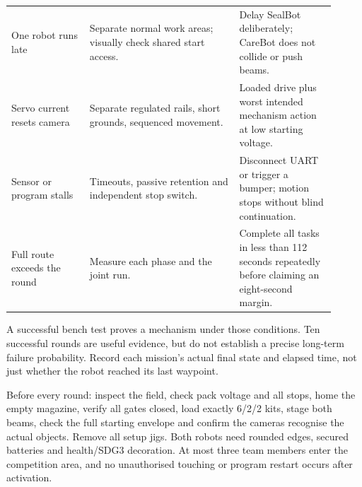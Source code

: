 \documentclass[10pt,a4paper]{article}
\begin{document}
\begin{longtable}{@{}>{\raggedright\arraybackslash}p{0.22\linewidth}>{\raggedright\arraybackslash}p{0.42\linewidth}>{\raggedright\arraybackslash}p{0.27\linewidth}@{}}
One robot runs late & Separate normal work areas; visually check shared start access. & Delay SealBot deliberately; CareBot does not collide or push beams. \\[3pt]
Servo current resets camera & Separate regulated rails, short grounds, sequenced movement. & Loaded drive plus worst intended mechanism action at low starting voltage. \\[3pt]
Sensor or program stalls & Timeouts, passive retention and independent stop switch. & Disconnect UART or trigger a bumper; motion stops without blind continuation. \\[3pt]
Full route exceeds the round & Measure each phase and the joint run. & Complete all tasks in less than 112 seconds repeatedly before claiming an eight-second margin. \\[3pt]
\bottomrule\end{longtable}\normalsize
A successful bench test proves a mechanism under those conditions. Ten successful rounds are useful evidence, but do not establish a precise long-term failure probability. Record each mission's actual final state and elapsed time, not just whether the robot reached its last waypoint.

Before every round: inspect the field, check pack voltage and all stops, home the empty magazine, verify all gates closed, load exactly 6/2/2 kits, stage both beams, check the full starting envelope and confirm the cameras recognise the actual objects. Remove all setup jigs. Both robots need rounded edges, secured batteries and health/SDG3 decoration. At most three team members enter the competition area, and no unauthorised touching or program restart occurs after activation.
\end{document}
